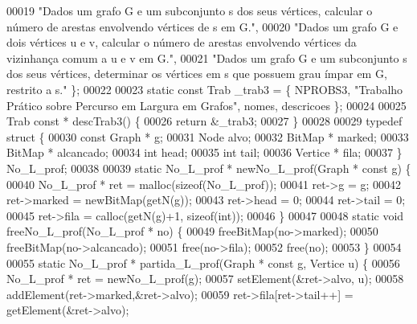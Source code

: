 \begin{DoxyCode}
00019                                                                                         \textcolor{stringliteral}{"Dados um grafo G e
       um subconjunto s dos seus vértices, calcular o número de arestas envolvendo vértices de s em G."},
00020                                                                                         \textcolor{stringliteral}{"Dados um grafo G e
       dois vértices u e v, calcular o número de arestas envolvendo vértices da vizinhança comum a u e v em G."},
00021                                                                                         \textcolor{stringliteral}{"Dados um grafo G e
       um subconjunto s dos seus vértices, determinar os vértices em s que possuem grau ímpar em G, restrito a s."}
       \};
00022 
00023 \textcolor{keyword}{static} \textcolor{keyword}{const} Trab \_trab3 = \{ NPROBS3, \textcolor{stringliteral}{"Trabalho Prático sobre Percurso em Largura em Grafos"}, nomes, 
      descricoes \};
00024 
00025 Trab \textcolor{keyword}{const} * descTrab3() \{
00026         \textcolor{keywordflow}{return} &\_trab3;
00027 \}
00028 
00029 \textcolor{keyword}{typedef} \textcolor{keyword}{struct }\{
00030         \textcolor{keyword}{const} Graph *   g;
00031         Node                    alvo;
00032         BitMap *                marked;
00033         BitMap *                alcancado;
00034         \textcolor{keywordtype}{int}                             head;
00035         \textcolor{keywordtype}{int}                             tail;
00036         Vertice *               fila;
00037 \} No\_L\_prof;
00038 
00039 \textcolor{keyword}{static} No\_L\_prof * newNo\_L\_prof(Graph * \textcolor{keyword}{const} g) \{
00040         No\_L\_prof * ret = malloc(\textcolor{keyword}{sizeof}(No\_L\_prof));
00041         ret->g = g;
00042         ret->marked = newBitMap(getN(g));
00043         ret->head = 0;
00044         ret->tail = 0;
00045         ret->fila = calloc(getN(g)+1, \textcolor{keyword}{sizeof}(\textcolor{keywordtype}{int}));
00046 \}
00047 
00048 \textcolor{keyword}{static} \textcolor{keywordtype}{void} freeNo\_L\_prof(No\_L\_prof * no) \{
00049         freeBitMap(no->marked);
00050         freeBitMap(no->alcancado);
00051         free(no->fila);
00052         free(no);
00053 \}
00054 
00055 \textcolor{keyword}{static} No\_L\_prof * partida\_L\_prof(Graph * \textcolor{keyword}{const} g, Vertice u) \{
00056         No\_L\_prof * ret = newNo\_L\_prof(g);
00057         setElement(&ret->alvo, u);
00058         addElement(ret->marked,&ret->alvo);
00059         ret->fila[ret->tail++] = getElement(&ret->alvo);

\end{DoxyCode}
